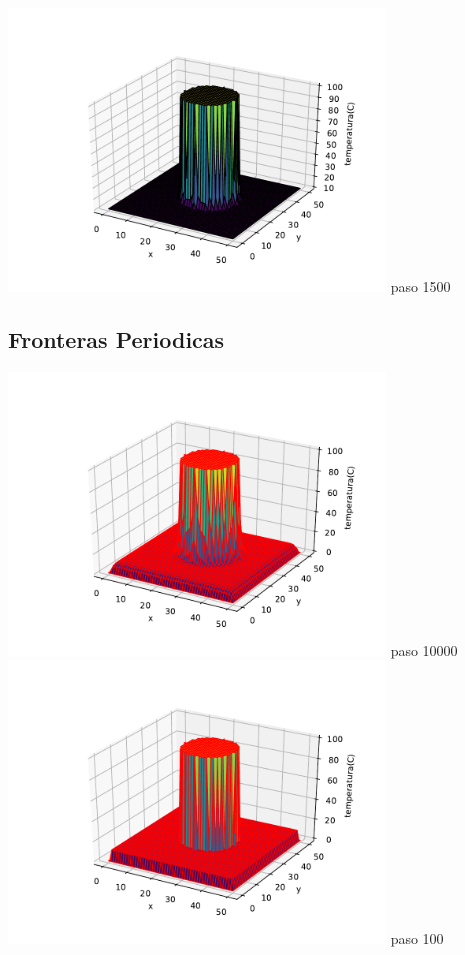 \documentclass[12pt]{article}
\begin{document}
\begin{centering}
\includegraphics[width=0.75\textwidth]{3d7.pdf}
paso 1500
\subsection{Fronteras Periodicas}
\includegraphics[width=0.75\textwidth]{3d8.pdf}
paso 10000
\\
\includegraphics[width=0.75\textwidth]{3d9.pdf}
paso 100
\\

\end{centering}
\end{document}
